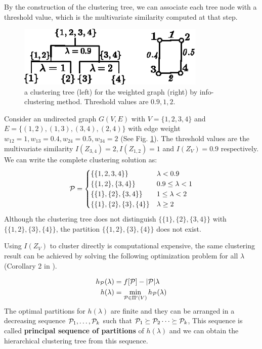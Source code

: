 \documentclass{article}
\begin{document}
By the construction of the clustering tree, we can associate each tree node with a threshold value, which is the multivariate similarity computed at that step.
\begin{example}
\begin{figure}
\centering
\includegraphics[width=0.8\textwidth]{pic/threshold.eps}
\caption{a clustering tree (left) for the weighted graph (right) by info-clustering method. Threshold values are $0.9, 1, 2$.}\label{fig:threshold}
\end{figure}
Consider an undirected graph $G(V, E)$ with $V=\{1,2,3,4\}$ and $E=\{(1,2),(1,3),(3,4),(2,4)\}$ with edge weight $w_{12}=1,w_{13}=0.4,w_{24}=0.5,w_{34}=2$ (See Fig. \ref{fig:threshold}). The threshold values are the multivariate similarity $I(Z_{3,4})=2, I(Z_{1,2})=1$ and $I(Z_V)=0.9$ respectively. We can write the complete clustering solution as:
\begin{equation*}
\P = 
\begin{cases}
\{\{1,2,3,4\}\} & \lambda < 0.9 \\
\{\{1,2\},\{3,4\}\} & 0.9 \leq \lambda < 1 \\
\{\{1\},\{2\},\{3,4\}\} & 1 \leq \lambda < 2\\
\{\{1\},\{2\},\{3\},\{4\}\} & \lambda \geq 2
\end{cases}
\end{equation*}
Although the clustering tree does not distinguish $\{\{1\},\{2\},\{3,4\}\}$ with $\{\{1,2\},\{3\}, \{4\}\}$, the partition $\{\{1,2\},\{3\}, \{4\}\}$ does not exist.
\end{example}
Using $I(Z_V)$ to cluster directly is computational expensive, the same clustering result can be achieved by solving the following optimization problem for all $\lambda$ (Corollary 2 in \cite{RN1}).
\begin{theorem}\label{thm:psp}
\begin{align}\label{eq:hL}
h_{\P}(\lambda) &=  f[\P] - \abs{\P} \lambda  \\
h(\lambda) &= \min_{\P \in \Pi'(V)} h_{\P}(\lambda)
\end{align}
The optimal partitions for $h(\lambda)$ are finite and they can be arranged in a decreasing sequence $\P_1, \dots, \P_k$ such that $\P_1 \succeq \P_2 \dots \succeq \P_k$, This sequence is called \textbf{principal sequence of partitions} of $h(\lambda)$ and we can obtain the hierarchical clustering tree from this sequence.
\end{theorem}
\end{document}
